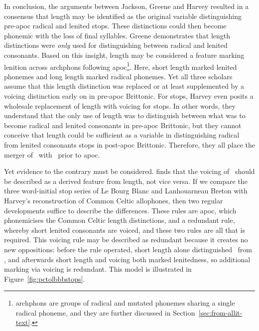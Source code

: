 In conclusion, the arguments between Jackson, Greene and Harvey resulted in a consensus that length may be identified as the original variable distinguishing pre-\gls{apoc} radical and lenited stops. These distinctions could then become phonemic with the loss of final syllables. Greene demonstrates that length distinctions were \emph{only} used for distinguishing between radical and lenited consonants. Based on this insight, length may be considered a feature marking lenition across \gls{archphon}s following \gls{apoc}\footnote{\Gls{archphon}s are groups of radical and mutated phonemes sharing a single radical phoneme, and they are further discussed in Section~\ref{sec:from-allit-text}.}. Here, short length marked lenited \gls{phoneme}s and long length marked radical \gls{phoneme}s. Yet all three scholars assume that this length distinction was replaced or at least supplemented by a voicing distinction early on in pre-\gls{apoc} Brittonic. For stops, Harvey even posits a wholesale replacement of length with voicing for stops. In other words, they understand that the only use of length was to distinguish between what was to become radical and lenited consonants in pre-\gls{apoc} Brittonic, but they cannot conceive that length could be sufficient as a variable in distinguishing radical from lenited consonants stops in post-\gls{apoc} Brittonic. Therefore, they all place the merger of \lT\ with \xD\ prior to \gls{apoc}.

Yet evidence to the contrary must be considered. \Textcite{carlyle_syllabic_1988} finds that the voicing of \lT\ should be described as a derived feature from length, not vice versa. If we compare the three word-initial stop series of Le Bourg Blanc and Lanhouarneau Breton with Harvey's reconstruction of Common Celtic allophones, then two regular developments suffice to describe the differences. These rules are \gls{apoc}, which phonemicises the Common Celtic length distinctions, and a redundant rule, whereby short \ie lenited consonants are voiced, and these two rules are all that is required. This voicing rule may be described as redundant because it creates no new oppositions: before the rule operated, short length alone distinguished \lT\ from \xT, and afterwards short length and voicing both marked lenitedness, so additional marking via voicing is redundant. This model is illustrated in Figure~\ref{fig:pctolbbbstops}.


